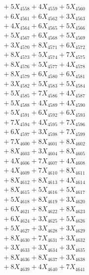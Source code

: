 \documentclass[a4paper,10pt]{article}
\begin{document}
{\begin{align}
&\;  + 5 X_{4558} + 4 X_{4559} + 5 X_{4560} \\[0.3ex]
&\;  + 6 X_{4561} + 6 X_{4562} + 3 X_{4563} \\[0.3ex]
&\;  + 4 X_{4564} + 6 X_{4565} + 5 X_{4566} \\[0.3ex]
&\;  + 5 X_{4567} + 6 X_{4568} + 5 X_{4569} \\[0.5ex]\allowbreak
&\;  + 3 X_{4570} + 8 X_{4571} + 6 X_{4572} \\[0.3ex]
&\;  + 8 X_{4573} + 5 X_{4574} + 7 X_{4575} \\[0.3ex]
&\;  + 8 X_{4576} + 5 X_{4577} + 4 X_{4578} \\[0.3ex]
&\;  + 8 X_{4579} + 6 X_{4580} + 6 X_{4581} \\[0.3ex]
&\;  + 3 X_{4582} + 5 X_{4583} + 5 X_{4584} \\[0.3ex]
&\;  + 5 X_{4585} + 7 X_{4586} + 4 X_{4587} \\[0.3ex]
&\;  + 5 X_{4588} + 4 X_{4589} + 4 X_{4590} \\[0.3ex]
&\;  + 5 X_{4591} + 6 X_{4592} + 6 X_{4593} \\[0.3ex]
&\;  + 7 X_{4594} + 4 X_{4595} + 7 X_{4596} \\[0.3ex]
&\;  + 6 X_{4597} + 3 X_{4598} + 7 X_{4599} \\[0.5ex]\allowbreak
&\;  + 7 X_{4600} + 8 X_{4601} + 8 X_{4602} \\[0.3ex]
&\;  + 8 X_{4603} + 3 X_{4604} + 8 X_{4605} \\[0.3ex]
&\;  + 4 X_{4606} + 7 X_{4607} + 4 X_{4608} \\[0.3ex]
&\;  + 4 X_{4609} + 7 X_{4610} + 8 X_{4611} \\[0.3ex]
&\;  + 8 X_{4612} + 8 X_{4613} + 4 X_{4614} \\[0.3ex]
&\;  + 8 X_{4615} + 5 X_{4616} + 5 X_{4617} \\[0.3ex]
&\;  + 5 X_{4618} + 8 X_{4619} + 3 X_{4620} \\[0.3ex]
&\;  + 6 X_{4621} + 8 X_{4622} + 8 X_{4623} \\[0.3ex]
&\;  + 6 X_{4624} + 3 X_{4625} + 5 X_{4626} \\[0.3ex]
&\;  + 5 X_{4627} + 3 X_{4628} + 3 X_{4629} \\[0.5ex]\allowbreak
&\;  + 8 X_{4630} + 7 X_{4631} + 3 X_{4632} \\[0.3ex]
&\;  + 3 X_{4633} + 3 X_{4634} + 3 X_{4635} \\[0.3ex]
&\;  + 8 X_{4636} + 8 X_{4637} + 3 X_{4638} \\[0.3ex]
&\;  + 8 X_{4639} + 4 X_{4640} + 7 X_{4641} \\[0.3ex]

\end{align}}
\end{document}
